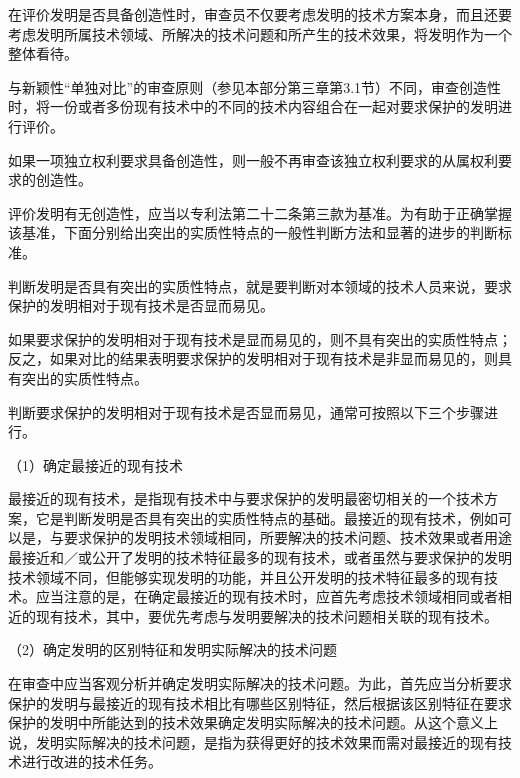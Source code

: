 在评价发明是否具备创造性时，审查员不仅要考虑发明的技术方案本身，而且还要考虑发明所属技术领域、所解决的技术问题和所产生的技术效果，将发明作为一个整体看待。

与新颖性“单独对比”的审查原则（参见本部分第三章第3.1节）不同，审查创造性时，将一份或者多份现有技术中的不同的技术内容组合在一起对要求保护的发明进行评价。

如果一项独立权利要求具备创造性，则一般不再审查该独立权利要求的从属权利要求的创造性。

评价发明有无创造性，应当以专利法第二十二条第三款为基准。为有助于正确掌握该基准，下面分别给出突出的实质性特点的一般性判断方法和显著的进步的判断标准。

{\setlength{\parindent}{21.8bp}判断发明是否具有突出的实质性特点，就是要判断对本领域的技术人员来说，要求保护的发明相对于现有技术是否显而易见。\par}

{\setlength{\parindent}{22.2bp}如果要求保护的发明相对于现有技术是显而易见的，则不具有突出的实质性特点；反之，如果对比的结果表明要求保护的发明相对于现有技术是非显而易见的，则具有突出的实质性特点。\par}

判断要求保护的发明相对于现有技术是否显而易见，通常可按照以下三个步骤进行。

{\setlength{\parindent}{17.1bp}（1）确定最接近的现有技术\par}

最接近的现有技术，是指现有技术中与要求保护的发明最密切相关的一个技术方案，它是判断发明是否具有突出的实质性特点的基础。最接近的现有技术，例如可以是，与要求保护的发明技术领域相同，所要解决的技术问题、技术效果或者用途最接近和／或公开了发明的技术特征最多的现有技术，或者虽然与要求保护的发明技术领域不同，但能够实现发明的功能，并且公开发明的技术特征最多的现有技术。应当注意的是，在确定最接近的现有技术时，应首先考虑技术领域相同或者相近的现有技术，其中，要优先考虑与发明要解决的技术问题相关联的现有技术。

{\setlength{\parindent}{17.1bp}（2）确定发明的区别特征和发明实际解决的技术问题\par}

在审查中应当客观分析并确定发明实际解决的技术问题。为此，首先应当分析要求保护的发明与最接近的现有技术相比有哪些区别特征，然后根据该区别特征在要求保护的发明中所能达到的技术效果确定发明实际解决的技术问题。从这个意义上说，发明实际解决的技术问题，是指为获得更好的技术效果而需对最接近的现有技术进行改进的技术任务。

